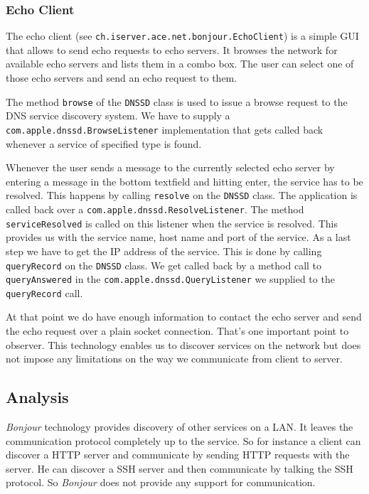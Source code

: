 \subsubsection{Echo Client}
The echo client (see \texttt{ch.iserver.ace.net.bonjour.EchoClient}) is a simple GUI that allows to send echo requests to echo servers. It browses the network for available echo servers and lists them in a combo box. The user can select one of those echo servers and send an echo request to them.

The method \texttt{browse} of the \texttt{DNSSD} class is used to issue a browse request to the DNS service discovery system. We have to supply a \texttt{com.apple.dnssd.BrowseListener} implementation that gets called back whenever a service of specified type is found.

Whenever the user sends a message to the currently selected echo server by entering a message in the bottom textfield and hitting enter, the service has to be resolved. This happens by calling \texttt{resolve} on the \texttt{DNSSD} class. The application is called back over a \texttt{com.apple.dnssd.ResolveListener}. The method \texttt{serviceResolved} is called on this listener when the service is resolved. This provides us with the service name, host name and port of the service. As a last step we have to get the IP address of the service. This is done by calling \texttt{queryRecord} on the \texttt{DNSSD} class. We get called back by a method call to \texttt{queryAnswered} in the \texttt{com.apple.dnssd.QueryListener} we supplied to the \texttt{queryRecord} call.

At that point we do have enough information to contact the echo server and send the echo request over a plain socket connection. That's one important point to observer. This technology enables us to discover services on the network but does not impose any limitations on the way we communicate from client to server.



\subsection{Analysis}
\emph{Bonjour} technology provides discovery of other services on a LAN. It leaves the communication protocol completely up to the service. So for instance a client can discover a HTTP server and communicate by sending HTTP requests with the server. He can discover a SSH server and then communicate by talking the SSH protocol. So \emph{Bonjour} does not provide any support for communication.

